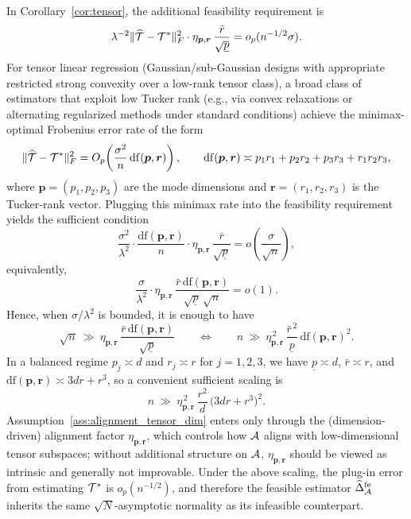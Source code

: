 \documentclass[authoryear,preprint,review,12pt]{elsarticle}
\begin{document}
	\begin{remark}\label{rem:scaling_tensor_fe}
		In Corollary~\ref{cor:tensor}, the additional feasibility requirement is
		\[
		\lambda^{-2}\|\widehat{\mathcal{T}}-\mathcal{T}^\ast\|_F^2\cdot\eta_{\bm p,\bm r}\,\frac{\bar r}{\sqrt{\underline p}}
		=o_p(n^{-1/2}\sigma).
		\]
		For tensor linear regression (Gaussian/sub-Gaussian designs with appropriate restricted strong convexity over a low-rank tensor class),
		a broad class of estimators that exploit low Tucker rank (e.g., via convex relaxations or alternating regularized methods under standard conditions)
		achieve the minimax-optimal Frobenius error rate of the form
		\[
		\|\widehat{\mathcal{T}}-\mathcal{T}^\ast\|_F^2
		=O_p\!\left(\frac{\sigma^2}{n}\,\mathrm{df}(\bm p,\bm r)\right),
		\qquad
		\mathrm{df}(\bm p,\bm r)\asymp
		p_1r_1+p_2r_2+p_3r_3+r_1r_2r_3,
		\]
		where $\bm p=(p_1,p_2,p_3)$ are the mode dimensions and $\bm r=(r_1,r_2,r_3)$ is the Tucker-rank vector.
		Plugging this minimax rate into the feasibility requirement yields the sufficient condition
		\[
		\frac{\sigma^2}{\lambda^{2}}\cdot \frac{\mathrm{df}(\bm p,\bm r)}{n}\cdot
		\eta_{\bm p,\bm r}\,\frac{\bar r}{\sqrt{\underline p}}
		=o\!\left(\frac{\sigma}{\sqrt{n}}\right),
		\]
		equivalently,
		\[
		\frac{\sigma}{\lambda^{2}}\cdot \eta_{\bm p,\bm r}\,
		\frac{\bar r\,\mathrm{df}(\bm p,\bm r)}{\sqrt{\underline p}\,\sqrt{n}}
		=o(1).
		\]
		Hence, when $\sigma/\lambda^{2}$ is bounded, it is enough to have
		\[
		\sqrt{n}\ \gg\ \eta_{\bm p,\bm r}\,
		\frac{\bar r\,\mathrm{df}(\bm p,\bm r)}{\sqrt{\underline p}}
		\qquad\Longleftrightarrow\qquad
		n\ \gg\ \eta_{\bm p,\bm r}^{\,2}\,
		\frac{\bar r^{\,2}}{\underline p}\,\mathrm{df}(\bm p,\bm r)^{2}.
		\]
		In a balanced regime $p_j\asymp d$ and $r_j\asymp r$ for $j=1,2,3$, we have
		$\underline p\asymp d$, $\bar r\asymp r$, and
		$\mathrm{df}(\bm p,\bm r)\asymp 3dr + r^3$, so a convenient sufficient scaling is
		\[
		n\ \gg\ \eta_{\bm p,\bm r}^{\,2}\,
		\frac{r^{2}}{d}\,\bigl(3dr + r^{3}\bigr)^{2}.
		\]
		Assumption~\ref{ass:alignment_tensor_dim} enters only through the (dimension-driven) alignment factor
		$\eta_{\bm p,\bm r}$, which controls how $\mathcal{A}$ aligns with low-dimensional tensor subspaces; without additional structure on $\mathcal{A}$,
		$\eta_{\bm p,\bm r}$ should be viewed as intrinsic and generally not improvable. Under the above scaling,
		the plug-in error from estimating $\mathcal{T}^\ast$ is $o_p(n^{-1/2})$, and therefore the feasible estimator
		$\widehat{\Delta}_{\mathcal{A}}^{\mathrm{fe}}$ inherits the same $\sqrt{N}$-asymptotic normality as its infeasible counterpart.
	\end{remark}
	
\end{document}

